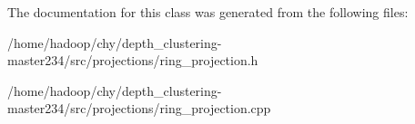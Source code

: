 The documentation for this class was generated from the following files\-:\begin{DoxyCompactItemize}
\item 
/home/hadoop/chy/depth\-\_\-clustering-\/master234/src/projections/ring\-\_\-projection.\-h\item 
/home/hadoop/chy/depth\-\_\-clustering-\/master234/src/projections/ring\-\_\-projection.\-cpp\end{DoxyCompactItemize}
